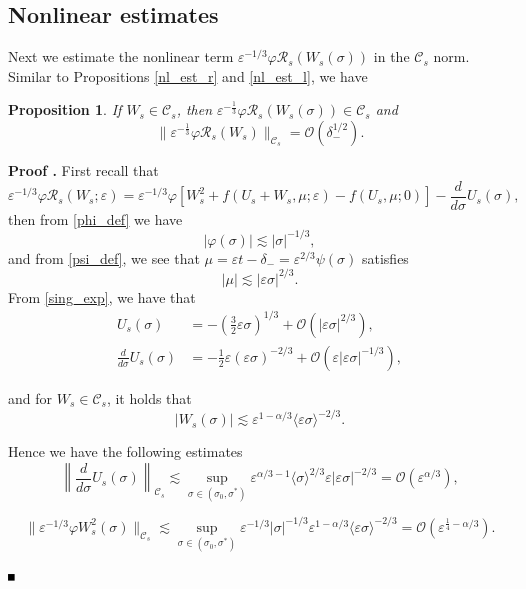 \documentclass[letterpaper,11pt]{article}
\newcommand{\rmO}{\mathcal{O}}
\newcommand{\eps}{\varepsilon}
\newcommand{\lar}{ \lesssim }
\newcommand{\Ral}{\mathcal{R}}
\numberwithin{equation}{section}
\theoremstyle{plain}
\newtheorem{Proposition}[Lemma]{Proposition}
\newenvironment{Proof}[1][\unskip]%
 {\begin{trivlist} \item[]{\bf Proof #1. }}%
 {\hspace*{\fill}$\rule{.4\baselineskip}{.4\baselineskip}$\end{trivlist}}
\begin{document}
\subsection{Nonlinear estimates}
Next we estimate the nonlinear term $\eps^{-1/3}\varphi \Ral_s(W_s(\sigma))$ in the $\mathcal{C}_s$ norm. Similar to Propositions \ref{nl_est_r} and \ref{nl_est_l}, we have
\begin{Proposition}\label{nl_est_s} If $W_s \in \mathcal{C}_s$, then $\eps^{-\frac{1}{3}}\varphi \Ral_s(W_s(\sigma))  \in \mathcal{C}_{s}$ and 
\begin{equation}\label{nl_est:Rs}
\| \eps^{-\frac{1}{3}}\varphi \Ral_s(W_s) \|_{\mathcal{C}_s} = \rmO(\delta_-^{1/2}).
\end{equation}
\end{Proposition}

\begin{Proof}
First recall that
\[
\eps^{-1/3}\varphi\Ral_s(W_s;\eps) = \eps^{-1/3}\varphi\left[  W_s^2+ f(U_s+W_s, \mu ; \eps)-f(U_s,\mu;0) \right]- \frac{d}{d\sigma}U_s(\sigma),
\]
then from \eqref{phi_def} we have
\[
|\varphi(\sigma)|  \lar | \sigma |^{-1/3},
\]
and from \eqref{psi_def}, we see that $\mu = \eps t -\delta_- = \eps^{2/3} \psi(\sigma)$ satisfies
\[
|\mu | \lar |\eps\sigma|^{2/3}.
\] 
From \eqref{sing_exp}, we have that
\begin{align*}
U_s(\sigma)  &= -\left(\frac{3}{2}\eps \sigma\right)^{1/3} + \rmO(|\eps \sigma|^{2/3} ),
\\
\frac{d}{d\sigma}U_s(\sigma) &= -\frac{1}{2}\eps(\eps\sigma)^{-2/3} + \rmO(\eps|\eps \sigma|^{-1/3}),
\end{align*}

and for $W_s \in \mathcal{C}_s$, it holds that
\[
|W_s(\sigma)| \lar \eps^{1-\alpha/3}\langle \eps \sigma\rangle^{-2/3}.
\]

Hence we have the following estimates
\begin{equation}\label{nl_est:Rs_1}
\left\|\frac{d}{d\sigma}U_s(\sigma) \right\|_{\mathcal{C}_s}  \lar \sup_{\sigma \in (\sigma_0, \sigma^{*})}\eps^{\alpha/3-1}\langle \sigma\rangle^{2/3} \eps|\eps \sigma|^{-2/3} = \rmO(\eps^{\alpha/3}),
\end{equation}

\begin{equation}\label{nl_est:Rs_2}
\|\eps^{-1/3}\varphi W_s^2(\sigma) \|_{\mathcal{C}_s}  \lar \sup_{\sigma \in (\sigma_0, \sigma^{*})}\eps^{-1/3}|\sigma|^{-1/3}\eps^{1-\alpha/3}\langle \eps \sigma\rangle^{-2/3} = \rmO(\eps^{\frac{1}{4}-\alpha/3}).
\end{equation}


\end{Proof}
\end{document}
